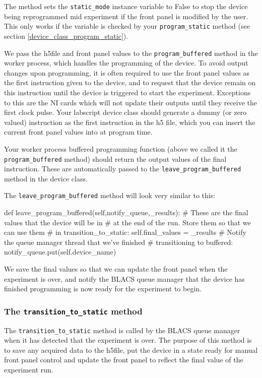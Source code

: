 \documentclass[12pt]{article}
\begin{document}
The method sets the \texttt{static\_mode} instance variable to False to stop the device being reprogrammed mid experiment if the front panel is modified by the user. This only works if the variable is checked by your \texttt{program\_static} method (see section \ref{device_class_program_static}).

We pass the h5file and front panel values to the \texttt{program\_buffered} method in the worker process, which handles the programming of the device. To avoid output changes upon programming, it is often required to use the front panel values as the first instruction given to the device, and to request that the device remain on this instruction until the device is triggered to start the experiment. Exceptions to this are the NI cards which will not update their outputs until they receive the first clock pulse. Your labscript device class should generate a dummy (or zero valued) instruction as the first instruction in the h5 file, which you can insert the current front panel values into at program time.

Your worker process buffered programming function (above we called it the \texttt{program\_buffered} method) should return the output values of the final instruction. These are automatically passed to the \texttt{leave\_program\_buffered} method in the device class.

The \texttt{leave\_program\_buffered} method will look very similar to this:
\begin{python}
    def leave_program_buffered(self,notify_queue,_results):
        # These are the final values that the device will be in
        # at the end of the run. Store them so that we can use them
        # in transition_to_static:
        self.final_values = _results
        # Notify the queue manager thread that we've finished
        # transitioning to buffered:
        notify_queue.put(self.device_name)
\end{python}

We save the final values so that we can update the front panel when the experiment is over, and notify the BLACS queue manager that the device has finished programming is now ready for the experiment to begin.

\subsubsection{The \texttt{transition\_to\_static} method}\label{device_class_transition_to_static}
The \texttt{transition\_to\_static} method is called by the BLACS queue manager when it has detected that the experiment is over. The purpose of this method is to save any acquired data to the h5file, put the device in a state ready for manual front panel control and update the front panel to reflect the final value of the experiment run.
\end{document}
